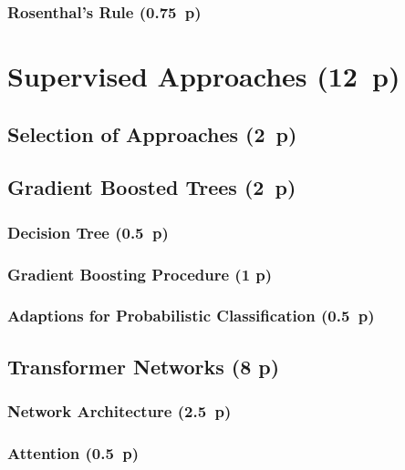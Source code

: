 \subsubsection{Rosenthal's Rule (0.75~p)}\label{rosenthals-rule}

\newpage
\section{Supervised Approaches (12~p)}\label{supervised-approaches}

\subsection{Selection of Approaches (2~p)}\label{selection-of-approaches}

\subsection{Gradient Boosted Trees (2~p)}\label{gradient-boosted-trees}

\subsubsection{Decision Tree (0.5~p)}\label{decision-tree}

\subsubsection{Gradient Boosting
  Procedure (1 p)}\label{gradient-boosting-procedure}

\subsubsection{Adaptions for Probabilistic
  Classification (0.5~p)}\label{adaptions-for-probablistic-classification}

\subsection{Transformer Networks (8 p)}\label{transformer-networks}

\subsubsection{Network Architecture (2.5~p)}\label{network-architecture}

\subsubsection{Attention (0.5~p)}\label{attention}


